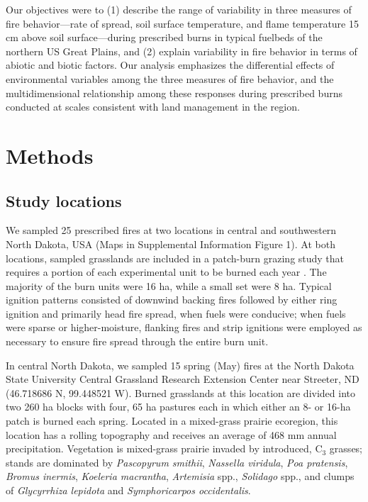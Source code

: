 \documentclass[referee, 
		     sn-basic]{sn-jnl}
\begin{document}
\begin{linenumbers}
Our objectives were to (1) describe the range of variability in three
measures of fire behavior---rate of spread, soil surface temperature,
and flame temperature 15 cm above soil surface---during prescribed burns
in typical fuelbeds of the northern US Great Plains, and (2) explain
variability in fire behavior in terms of abiotic and biotic factors.
Our analysis emphasizes the differential effects of environmental variables among the three measures of fire behavior, and the multidimensional relationship among these responses during prescribed burns conducted at scales consistent with land management in the region.

\hypertarget{methods}{%
\section{Methods}\label{methods}}

\hypertarget{study-locations}{%
\subsection{Study locations}\label{study-locations}}

We sampled 25 prescribed fires at two locations in central and
southwestern North Dakota, USA (Maps in Supplemental Information Figure
1). At both locations, sampled grasslands are included in a patch-burn
grazing study that requires a portion of each experimental unit to be
burned each year \citep{spiess2020}. The majority of the burn units were
16 ha, while a small set were 8 ha. Typical ignition patterns consisted
of downwind backing fires followed by either ring ignition and primarily
head fire spread, when fuels were conducive; when fuels were sparse or
higher-moisture, flanking fires and strip ignitions were employed as
necessary to ensure fire spread through the entire burn unit.

In central North Dakota, we sampled 15 spring (May) fires at the North
Dakota State University Central Grassland Research Extension Center near
Streeter, ND (46.718686 N, 99.448521 W). Burned grasslands at this
location are divided into two 260 ha blocks with four, 65 ha pastures
each in which either an 8- or 16-ha patch is burned each spring. Located
in a mixed-grass prairie ecoregion, this location has a rolling
topography and receives an average of 468 mm annual precipitation.
Vegetation is mixed-grass prairie invaded by introduced, C\(_3\)
grasses; stands are dominated by \emph{Pascopyrum smithii},
\emph{Nassella viridula}, \emph{Poa pratensis}, \emph{Bromus inermis},
\emph{Koeleria macrantha}, \emph{Artemisia} spp., \emph{Solidago} spp.,
and clumps of \emph{Glycyrrhiza lepidota} and \emph{Symphoricarpos
occidentalis}.


\end{linenumbers}
\end{document}
